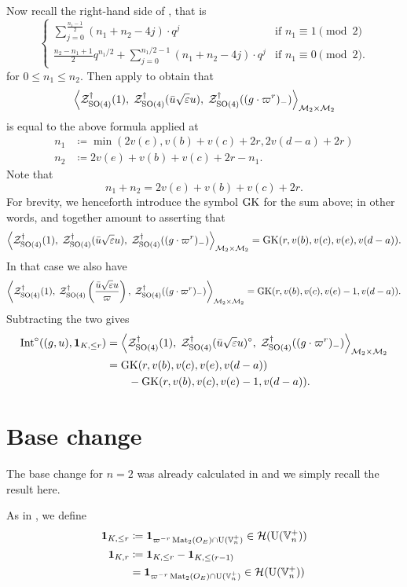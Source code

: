 Now recall the right-hand side of , that is
\[
  \begin{cases}
    \sum_{j=0}^{\frac{n_1-1}{2}} (n_1+n_2-4j) \cdot q^j & \text{if } n_1 \equiv 1 \pmod 2 \\
    \frac{n_2-n_1+1}{2} q^{n_1/2} + \sum_{j=0}^{n_1/2-1} (n_1+n_2-4j) \cdot q^j & \text{if } n_1 \equiv 0 \pmod 2.
  \end{cases}
\]
for $0 \le n_1 \le n_2$.
Then apply  to obtain that
\[
  \left< \mathcal Z^{\dagger}_{\operatorname{SO}(4)}(1), \;
    \mathcal Z^{\dagger}_{\operatorname{SO}(4)}(\bar u \sqrt{\varepsilon} u), \;
    \mathcal Z^{\dagger}_{\operatorname{SO}(4)}((g \cdot \varpi^r)_-) \right>_{\mathcal M_2 \times \mathcal M_2}
\]
is equal to the above formula applied at
\begin{align*}
  n_1 &\coloneqq \min(2v(e), v(b)+v(c)+2r, 2v(d-a)+2r) \\
  n_2 &\coloneqq 2v(e) + v(b) + v(c) + 2r - n_1.
\end{align*}
Note that
\[ n_1 + n_2 = 2v(e) + v(b) + v(c) + 2r. \]
For brevity, we henceforth introduce the symbol $\operatorname{GK}$ for the sum above;
in other words,  and 
together amount to asserting that
\[ \left< \mathcal Z^{\dagger}_{\operatorname{SO}(4)}(1), \; \mathcal Z^{\dagger}_{\operatorname{SO}(4)}(\bar u \sqrt{\varepsilon} u), \; \mathcal Z^{\dagger}_{\operatorname{SO}(4)}((g \cdot \varpi^r)_-) \right>_{\mathcal M_2 \times \mathcal M_2}
    = \operatorname{GK}(r, v(b), v(c), v(e), v(d-a)). \]
In that case we also have
\[
  \left< \mathcal Z^{\dagger}_{\operatorname{SO}(4)}(1), \;
    \mathcal Z^{\dagger}_{\operatorname{SO}(4)}\left(\frac{\bar u \sqrt{\varepsilon} u}{\varpi}\right), \;
    \mathcal Z^{\dagger}_{\operatorname{SO}(4)}((g \cdot \varpi^r)_-) \right>_{\mathcal M_2 \times \mathcal M_2}
    = \operatorname{GK}(r, v(b), v(c), v(e)-1, v(d-a)). \]
Subtracting the two gives
\begin{equation}
  \begin{aligned}
    \operatorname{Int}^\circ((g,u), \mathbf{1}_{K, \le r}) &=
      \left< \mathcal Z^{\dagger}_{\operatorname{SO}(4)}(1), \;
        \mathcal Z^{\dagger}_{\operatorname{SO}(4)}(\bar u \sqrt{\varepsilon} u)^\circ, \;
        \mathcal Z^{\dagger}_{\operatorname{SO}(4)}((g \cdot \varpi^r)_-) \right>_{\mathcal M_2 \times \mathcal M_2} \\
    &= \operatorname{GK}(r, v(b), v(c), v(e), v(d-a)) \\
    &\qquad- \operatorname{GK}(r, v(b), v(c), v(e)-1, v(d-a)).
  \end{aligned}
  \label{eq:int_subtract}
\end{equation}

\section{Base change}
\label{sec:finale_base_change}
The base change for $n=2$ was already calculated in \cite{ref:AFLspherical}
and we simply recall the result here.

As in , we define
\begin{align*}
  \mathbf{1}_{K, \le r} &\coloneqq \mathbf{1}_{\varpi^{-r} \operatorname{Mat}_2(O_E) \cap \operatorname{U}(\mathbb V_n^+)} \in \mathcal H(\operatorname{U}(\mathbb V_n^+)) \\
  \mathbf{1}_{K, r} &\coloneqq \mathbf{1}_{K, \le r} - \mathbf{1}_{K, \le (r-1)} \\
  &= \mathbf{1}_{\varpi^{-r} \operatorname{Mat}_2(O_E) \cap \operatorname{U}(\mathbb V_n^+)} \in \mathcal H(\operatorname{U}(\mathbb V_n^+)) \\
\end{align*}

